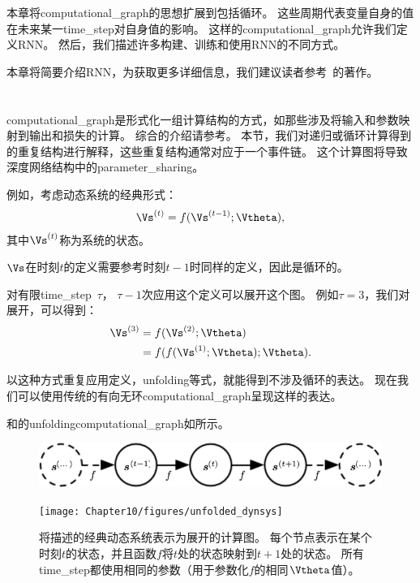 本章将\gls{computational_graph}的思想扩展到包括循环。
这些周期代表变量自身的值在未来某一\gls{time_step}对自身值的影响。
这样的\gls{computational_graph}允许我们定义\gls{RNN}。
然后，我们描述许多构建、训练和使用\gls{RNN}的不同方式。

本章将简要介绍\gls{RNN}，为获取更多详细信息，我们建议读者参考~\cite{Graves-book2012}的著作。


\section{}
\label{sec:unfolding_computational_graphs}
\gls{computational_graph}是形式化一组计算结构的方式，如那些涉及将输入和参数映射到输出和损失的计算。
综合的介绍请参考。
本节，我们对递归或循环计算得到的重复结构进行解释，这些重复结构通常对应于一个事件链。
这个计算图将导致深度网络结构中的\gls{parameter_sharing}。

例如，考虑动态系统的经典形式：
\begin{align}
\label{eq:101s}
\Vs^{(t)} = f(\Vs^{(t-1)}; \Vtheta),
\end{align}
其中$ \Vs^{(t)}$称为系统的状态。

$\Vs$在时刻$t$的定义需要参考时刻$t-1$时同样的定义，因此是循环的。

对有限\gls{time_step}~$\tau$， $\tau-1$次应用这个定义可以展开这个图。
例如$\tau = 3$，我们对展开，可以得到：
\begin{align}
 \Vs^{(3)} &= f(\Vs^{(2)}; \Vtheta) \\
 & = f(f(\Vs^{(1)}; \Vtheta) ; \Vtheta).
  \label{eq:103s}
\end{align}

以这种方式重复应用定义，\gls{unfolding}等式，就能得到不涉及循环的表达。
现在我们可以使用传统的有向无环\gls{computational_graph}呈现这样的表达。

和的\gls{unfolding}\gls{computational_graph}如所示。
\begin{figure}[!htb]
\ifOpenSource
\centerline{\includegraphics[scale=0.5]{images/89.png}}
\else
\centerline{\texttt{[image: Chapter10/figures/unfolded\_dynsys]}}
\fi
\caption{将描述的经典动态系统表示为展开的计算图。
每个节点表示在某个时刻$t$的状态，并且函数$f$将$t$处的状态映射到$t+1$处的状态。
所有\gls{time_step}都使用相同的参数（用于参数化$f$的相同$\Vtheta$值）。
}
\label{fig:chap10_unfolded_dynsys}
\end{figure}

